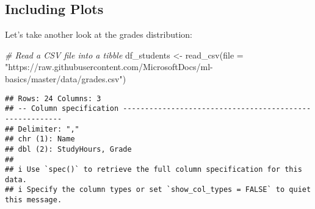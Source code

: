 \documentclass[
]{article}
\newenvironment{Shaded}{\begin{snugshade}}{\end{snugshade}}
\newcommand{\AttributeTok}[1]{\textcolor[rgb]{0.77,0.63,0.00}{#1}}
\newcommand{\CommentTok}[1]{\textcolor[rgb]{0.56,0.35,0.01}{\textit{#1}}}
\newcommand{\FunctionTok}[1]{\textcolor[rgb]{0.00,0.00,0.00}{#1}}
\newcommand{\NormalTok}[1]{#1}
\newcommand{\OtherTok}[1]{\textcolor[rgb]{0.56,0.35,0.01}{#1}}
\newcommand{\StringTok}[1]{\textcolor[rgb]{0.31,0.60,0.02}{#1}}
\begin{document}
\hypertarget{including-plots}{%
\subsection{Including Plots}\label{including-plots}}

Let's take another look at the grades distribution:

\begin{Shaded}
\begin{Highlighting}[]
\CommentTok{\# Read a CSV file into a tibble}
\NormalTok{df\_students }\OtherTok{\textless{}{-}} \FunctionTok{read\_csv}\NormalTok{(}\AttributeTok{file =} \StringTok{"https://raw.githubusercontent.com/MicrosoftDocs/ml{-}basics/master/data/grades.csv"}\NormalTok{)}
\end{Highlighting}
\end{Shaded}

\begin{verbatim}
## Rows: 24 Columns: 3
## -- Column specification --------------------------------------------------------
## Delimiter: ","
## chr (1): Name
## dbl (2): StudyHours, Grade
## 
## i Use `spec()` to retrieve the full column specification for this data.
## i Specify the column types or set `show_col_types = FALSE` to quiet this message.
\end{verbatim}
\end{document}

